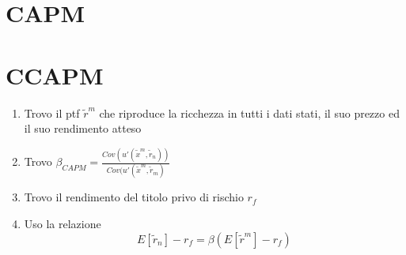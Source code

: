 \documentclass[a4paper,notitlepage]{report}%
\begin{document}
\begin{multicols*}{2}
\section*{CAPM}



\section*{CCAPM}
    \begin{enumerate}
        \item Trovo il ptf $\tilde{r}^m$ che riproduce la ricchezza in tutti i dati stati, il suo prezzo ed il suo rendimento atteso
        \item Trovo $\beta_{CAPM} = \frac{Cov(u'(\tilde{x}^m,\tilde{r}_n))}{Cov(u'(\tilde{x}^m,\tilde{r}_m)}$
        \item Trovo il rendimento del titolo privo di rischio $r_f$
        \item Uso la relazione \[
                E[\tilde{r}_n]-r_f = \beta (E[\tilde{r}^m]-r_f) 
            \]
    \end{enumerate}


\blindtext[4]
    
\end{multicols*}
\end{document}
